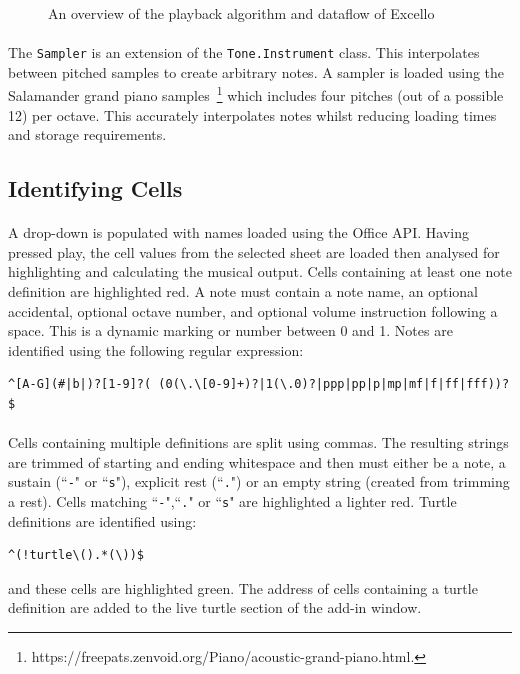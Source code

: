 \begin{figure}[htb]
\begin{center}

\end{center}
\caption{An overview of the playback algorithm and dataflow of Excello\label{fig:overview}}
\end{figure}

\paragraph{} The \texttt{Sampler} is an extension of the \texttt{Tone.Instrument} class. This interpolates between pitched samples to create arbitrary notes. A sampler is loaded using the Salamander grand piano samples~\footnote{https://freepats.zenvoid.org/Piano/acoustic-grand-piano.html.} which includes four pitches (out of a possible 12) per octave. This accurately interpolates notes whilst reducing loading times and storage requirements.

\subsection{Identifying Cells}

\paragraph{} A drop-down is populated with names loaded using the Office API. Having pressed play, the cell values from the selected sheet are loaded then analysed for highlighting and calculating the musical output. Cells containing at least one note definition are highlighted red. A note must contain a note name, an optional accidental, optional octave number, and optional volume instruction following a space. This is a dynamic marking or number between 0 and 1. Notes are identified using the following regular expression:

\begin{verbatim}
^[A-G](#|b|)?[1-9]?( (0(\.\[0-9]+)?|1(\.0)?|ppp|pp|p|mp|mf|f|ff|fff))?$
\end{verbatim}

\paragraph{} Cells containing multiple definitions are split using commas. The resulting strings are trimmed of starting and ending whitespace and then must either be a note, a sustain (``\texttt{-}" or ``\texttt{s}"), explicit rest (``\texttt{.}") or an empty string (created from trimming a rest). Cells matching ``\texttt{-}",``\texttt{.}" or ``\texttt{s}" are highlighted a lighter red. Turtle definitions are identified using:
\begin{verbatim}
^(!turtle\().*(\))$
\end{verbatim}
and these cells are highlighted green. The address of cells containing a turtle definition are added to the live turtle section of the add-in window.


